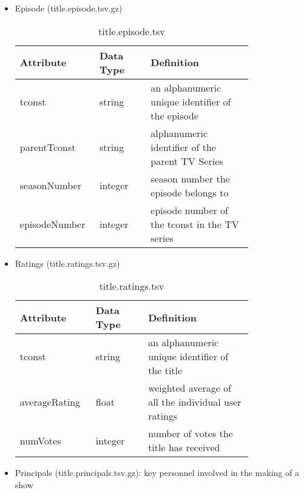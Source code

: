 \documentclass[10pt,titlepage]{article}
\begin{document}
\begin{itemize}
    \item Episode (title.episode.tsv.gz)

        \begin{table}[H]
            \centering
            \begin{tabular}{p{0.2\linewidth} | p{0.2\linewidth} | p{0.4\linewidth}}
                \hline
                \textbf{Attribute} & \textbf{Data Type}  & \textbf{Definition}\\
                \hline
                tconst & string & an alphanumeric unique identifier of the episode \\
                \hline
                parentTconst & string & alphanumeric identifier of the parent TV Series \\
                \hline
                seasonNumber & integer & season number the episode belongs to \\
                \hline
                episodeNumber & integer & episode number of the tconst in the TV series \\
                \hline
            \end{tabular}
            \caption{title.episode.tsv}
            \label{tab:imdb_episode}
        \end{table}

    \item Ratings (title.ratings.tsv.gz)

        \begin{table}[H]
            \centering
            \begin{tabular}{p{0.2\linewidth} | p{0.2\linewidth} | p{0.4\linewidth}}
                \hline
                \textbf{Attribute} & \textbf{Data Type}  & \textbf{Definition}\\
                \hline
                tconst & string & an alphanumeric unique identifier of the title \\
                \hline
                averageRating & float & weighted average of all the individual user ratings \\
                \hline
                numVotes & integer & number of votes the title has received \\
                \hline
            \end{tabular}
            \caption{title.ratings.tsv}
            \label{tab:imdb_ratings}
        \end{table}

    \item Principals (title.principals.tsv.gz): key personnel involved in the making of a show


\end{itemize}
\end{document}

